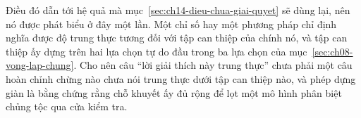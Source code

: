 Điều đó dẫn tới hệ quả mà mục~\ref{sec:ch14-dieu-chua-giai-quyet} sẽ dùng lại,
nên nó được phát biểu ở đây một lần. Một chỉ số hay một phương pháp chỉ định
nghĩa được độ trung thực tương đối với tập can thiệp của chính nó, và tập can
thiệp ấy dựng trên hai lựa chọn tự do đầu trong ba lựa chọn của
mục~\ref{sec:ch08-vong-lap-chung}. Cho nên câu \enquote{lời giải thích này
trung thực} chưa phải một câu hoàn chỉnh chừng nào chưa nói trung thực dưới tập
can thiệp nào, và phép dựng giàn là bằng chứng rằng chỗ khuyết ấy đủ rộng để
lọt một mô hình phân biệt chủng tộc qua cửa kiểm tra.

%
